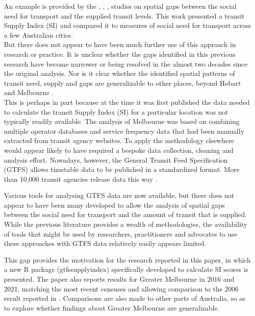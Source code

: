 \documentclass[preprint, 3p,
authoryear]{elsarticle} %
\begin{document}
An example is provided by the \citet{Currie2003Hobart},
\citet{Currie2004Gap}, \citet{Currie2007Identifying},
\citet{currie2010identifying} studies on spatial gaps between the social
need for transport and the supplied transit levels. This work presented
a transit Supply Index (SI) and compared it to measures of social need
for transport across a few Australian cities.\\
But there does not appear to have been much further use of this approach
in research or practice. It is unclear whether the gaps identified in
this previous research have become narrower or being resolved in the
almost two decades since the original analysis. Nor is it clear whether
the identified spatial patterns of transit need, supply and gaps are
generalizable to other places, beyond Hobart
\citep{Currie2003Hobart, Currie2004Gap} and Melbourne
\citep{Currie2007Identifying, currie2010identifying}.\\
This is perhaps in part because at the time it was first published the
data needed to calculate the transit Supply Index (SI) for a particular
location was not typically readily available. The
\citet{currie2010identifying} analysis of Melbourne was based on
combining multiple operator databases and service frequency data that
had been manually extracted from transit agency websites. To apply the
methodology elsewhere would appear likely to have required a bespoke
data collection, cleaning and analysis effort. Nowadays, however, the
General Transit Feed Specification (GTFS) allows timetable data to be
published in a standardized format. More than 10,000 transit agencies
release data this way \citep{GTFS}.

Various tools for analysing GTFS data are now available, but there does
not appear to have been many developed to allow the analysis of spatial
gaps between the social need for transport and the amount of transit
that is supplied. While the previous literature provides a wealth of
methodologies, the availability of tools that might be used by
researchers, practitioners and advocates to use these approaches with
GTFS data relatively easily appears limited.

This gap provides the motivation for the research reported in this
paper, in which a new R package (gtfssupplyindex) specifically developed
to calculate SI scores is presented. The paper also reports results for
Greater Melbourne in 2016 and 2021, matching the most recent censuses
and allowing comparison to the 2006 result reported in
\citet{currie2010identifying}. Comparisons are also made to other parts
of Australia, so as to explore whether findings about Greater Melbourne
are generalizable.
\end{document}
